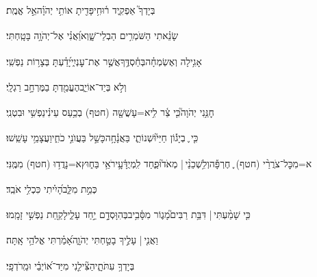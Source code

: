 \documentclass[12pt]{article}
\newcommand{\loc}[1]{\textsuperscript{\locf{#1}}}
\begin{document}
{\loc{ ו}~}‏בְּיָדְךָ֮ אַפְקִ֢יד ר֫וּחִ֥י{\hfill}פָּדִ֖יתָ אוֹתִ֥י יְהֹוָ֗ה{\hfill}אֵ֣ל אֱמֶֽת׃\par

{\loc{ ז}~}‏שָׂנֵ֗אתִי הַשֹּׁמְרִ֥ים הַבְלֵי־שָׁ֑וְא{\hfill}וַ֝אֲנִ֗י אֶל־יְהֹוָ֥ה בָּטָֽחְתִּי׃\par

{\loc{ ח}~}‏אָגִ֥ילָה וְאֶשְׂמְחָ֗ה{\hfill}בְּחַ֫סְדֶּ֥ךָ\newline\hspace*{.5em}אֲשֶׁ֣ר  אֶת־עׇנְיִ֑י{\hfill}יָ֝דַ֗עְתָּ בְּצָר֥וֹת נַפְשִֽׁי׃\par

{\loc{ ט}~}‏וְלֹ֣א  בְּיַד־אוֹיֵ֑ב{\hfill}הֶעֱמַ֖דְתָּ בַמֶּרְחָ֣ב רַגְלָֽי׃\par

{\loc{ י}~}‏חׇנֵּ֥נִי יְהֹוָה֮{\hfill}כִּ֤י צַ֫ר לִ֥י\newline\hspace*{.5em}א=עָשֲׁשָׁ֖ה (חטף) בְכַ֥עַס עֵינִ֗י{\hfill}נַפְשִׁ֥י וּבִטְנִֽי׃\par

{\loc{ יא}~}‏כִּ֤י ֪ בְיָג֡וֹן חַיַּי֮{\hfill}וּשְׁנוֹתַ֢י בַּאֲנָ֫חָ֥ה\newline\hspace*{.5em}כָּשַׁ֣ל בַּעֲוֺנִ֣י כֹחִ֑י{\hfill}וַעֲצָמַ֥י עָשֵֽׁשׁוּ׃\par

{\loc{ יב}~}‏א=מִכׇּל־צֹרֲרַ֨י (חטף) ֪ חֶרְפָּ֡ה{\hfill}וְלִ֥שְׁכֵנַ֨י | \newline\hspace*{.5em}מְאֹד֮{\hfill}וּפַ֢חַד לִֽמְיֻדָּ֫עָ֥י\newline\hspace*{.5em}רֹאַ֥י בַּח֑וּץ{\hfill}א=נָדֲד֥וּ (חטף) מִמֶּֽנִּי׃\par

{\loc{ יג}~}‏ כְּמֵ֣ת מִלֵּ֑ב{\hfill}הָ֝יִ֗יתִי כִּכְלִ֥י אֹבֵֽד׃\par

{\loc{ יד}~}‏כִּ֤י שָׁמַ֨עְתִּי |  דִּבַּ֥ת רַבִּים֮{\hfill}מָג֢וֹר מִסָּ֫בִ֥יב\newline\hspace*{.5em}בְּהִוָּסְדָ֣ם יַ֣חַד עָלַ֑י{\hfill}לָקַ֖חַת נַפְשִׁ֣י זָמָֽמוּ׃\par

{\loc{ טו}~}‏וַאֲנִ֤י |  עָלֶ֣יךָ בָטַ֣חְתִּי יְהֹוָ֑ה{\hfill}אָ֝מַ֗רְתִּי אֱלֹהַ֥י אָֽתָּה׃\par

{\loc{ טז}~}‏בְּיָדְךָ֥ עִתֹּתָ֑י{\hfill}הַצִּ֘ילֵ֤נִי מִיַּד־א֝וֹיְבַ֗י וּמֵֽרֹדְפָֽי׃\par
\end{document}
